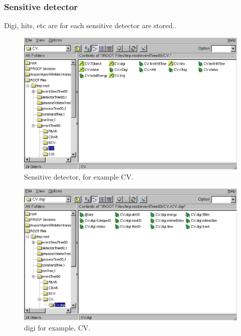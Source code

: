 \documentclass[a4paper,12pt]{article}
\begin{document}
   \subsubsection{Sensitive detector}
   Digi, hits, etc are for each sensitive detector are stored.. 
   \begin{figure}[H]
    \begin{center}
     \includegraphics[scale=0.5]{xwd/cv.eps}
    \end{center}
    \caption{Sensitive detector, for example CV.}
   \end{figure}
    
    \begin{figure}[H]
     \begin{center}
      \includegraphics[scale=0.5]{xwd/digi.eps}
     \end{center}
     \caption{digi for example, CV.}
    \end{figure}
\end{document}
